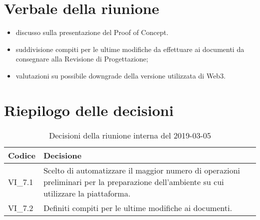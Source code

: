 \section{Verbale della riunione}
\begin{itemize}
	\item discusso sulla presentazione del Proof of Concept.
	\item suddivisione compiti per le ultime modifiche da effettuare ai 
	documenti 
	da consegnare alla Revisione di Progettazione;
	\item valutazioni su possibile downgrade della versione utilizzata di Web3.
	
\end{itemize}

\hspace{3cm}

\section{Riepilogo delle decisioni}

	
	\begin{longtable}{ >{\centering}p{} >{}p{}}
		\caption{Decisioni della riunione interna del 2019-03-05}\\	
		\rowcolorhead
		\textbf{\color{white}Codice} 
		& \centering\textbf{\color{white}Decisione} 
		\tabularnewline 
		\endfirsthead
		VI\_7.1 & Scelto di automatizzare il maggior numero di operazioni 
		preliminari per la preparazione dell'ambiente su cui utilizzare la 
		piattaforma.
		\tabularnewline 
		VI\_7.2 & Definiti compiti per le ultime modifiche ai documenti.
		
		
		
	\end{longtable}
	




